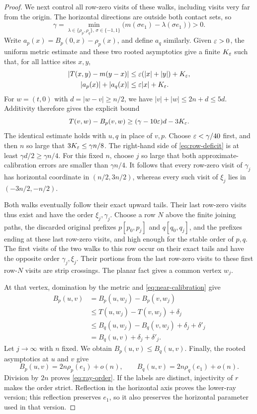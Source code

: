 \begin{proof}
We next control all row-zero visits of these walks, including visits very
far from the origin.  The horizontal directions are outside both contact
sets, so
\[
 \gamma=
 \min_{\lambda\in\{\rho_p,\rho_q\},\,\sigma\in\{-1,1\}}
 \bigl(m(\sigma e_1)-\lambda(\sigma e_1)\bigr)>0.
\]
Write $a_p(x)=B_p(0,x)-\rho_p(x)$, and define $a_q$ similarly.  Given
$\varepsilon>0$, the uniform metric estimate and these two rooted asymptotics
give a finite $K_\varepsilon$ such that, for all lattice sites $x,y$,
\begin{align*}
 |T(x,y)-m(y-x)|&\leq\varepsilon(|x|+|y|)+K_\varepsilon,\\
 |a_p(x)|+|a_q(x)|&\leq\varepsilon|x|+K_\varepsilon.
\end{align*}
For $w=(t,0)$ with $d=|w-v|\geq n/2$, we have
$|v|+|w|\leq2n+d\leq5d$.  Additivity therefore gives the explicit bound
\begin{equation}\label{eq:row-deficit}
 T(v,w)-B_p(v,w)
 \geq (\gamma-10\varepsilon)d-3K_\varepsilon.
\end{equation}
The identical estimate holds with $u,q$ in place of $v,p$.  Choose
$\varepsilon<\gamma/40$ first, and then $n$ so large that
$3K_\varepsilon\leq\gamma n/8$.  The right-hand side of
\eqref{eq:row-deficit} is at least $\gamma d/2\geq\gamma n/4$.
For this fixed $n$, choose $j$ so large that both approximate-calibration
errors are smaller than $\gamma n/4$.  It follows that every row-zero
visit of $\gamma_j$ has horizontal coordinate in $(n/2,3n/2)$, whereas
every such visit of $\xi_j$ lies in $(-3n/2,-n/2)$.

Both walks eventually follow their exact upward tails.  Their last
row-zero visits thus exist and have the order $\xi_j,\gamma_j$.
Choose a row $N$ above the finite joining paths, the discarded original
prefixes $p[p_0,p_j]$ and $q[q_0,q_j]$, and the prefixes ending at these last
row-zero visits, and high enough for the stable order of $p,q$.
The first visits of the two walks to this row occur on their exact tails
and have the opposite order $\gamma_j,\xi_j$.  Their portions from the
last row-zero visits to these first row-$N$ visits are strip crossings.
The planar fact gives a common vertex $w_j$.

At that vertex, domination by the metric and \eqref{eq:near-calibration}
give
\begin{align*}
 B_p(u,v)
 &=B_p(u,w_j)-B_p(v,w_j)\\
 &\leq T(u,w_j)-T(v,w_j)+\delta_j\\
 &\leq B_q(u,w_j)-B_q(v,w_j)+\delta_j+\delta'_j\\
 &=B_q(u,v)+\delta_j+\delta'_j.
\end{align*}
Let $j\to\infty$ with $n$ fixed.  We obtain $B_p(u,v)\leq B_q(u,v)$.
Finally, the rooted asymptotics at $u$ and $v$ give
\[
 B_p(u,v)=2n\rho_p(e_1)+o(n),\qquad
 B_q(u,v)=2n\rho_q(e_1)+o(n).
\]
Division by $2n$ proves \eqref{eq:ray-order}.  If the labels are distinct,
injectivity of $r$ makes the order strict.  Reflection in the horizontal
axis proves the lower-ray version; this reflection preserves $e_1$, so it
also preserves the horizontal parameter used in that version.
\end{proof}

